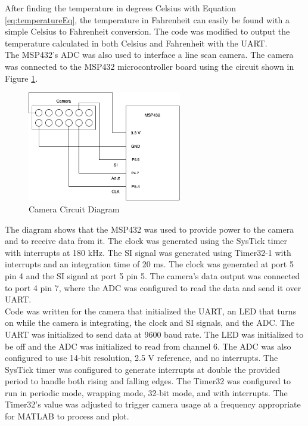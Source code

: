 \documentclass[CMPE]{KGCOEReport}
\begin{document}
After finding the temperature in degrees Celsius with Equation \ref{eq:temperatureEq}, the temperature in Fahrenheit can easily be found with a simple Celsius to Fahrenheit conversion. The code was modified to output the temperature calculated in both Celsius and Fahrenheit with the UART.\\

The MSP432's ADC was also used to interface a line scan camera. The camera was connected to the MSP432 microcontroller board using the circuit shown in Figure \ref{fig:cameraDiagram}.

\begin{figure}[H]
    \centering
    \includegraphics[width=0.6\textwidth]{cameraDiagram.png}
    \caption{Camera Circuit Diagram}
    \label{fig:cameraDiagram}
\end{figure}

The diagram shows that the MSP432 was used to provide power to the camera and to receive data from it. The clock was generated using the SysTick timer with interrupts at 180 kHz. The SI signal was generated using Timer32-1 with interrupts and an integration time of 20 ms. The clock was generated at port 5 pin 4 and the SI signal at port 5 pin 5. The camera's data output was connected to port 4 pin 7, where the ADC was configured to read the data and send it over UART.\\

Code was written for the camera that initialized the UART, an LED that turns on while the camera is integrating, the clock and SI signals, and the ADC. The UART was initialized to send data at 9600 baud rate. The LED was initialized to be off and the ADC was initialized to read from channel 6. The ADC was also configured to use 14-bit resolution, 2.5 V reference, and no interrupts. The SysTick timer was configured to generate interrupts at double the provided period to handle both rising and falling edges. The Timer32 was configured to run in periodic mode, wrapping mode, 32-bit mode, and with interrupts. The Timer32's value was adjusted to trigger camera usage at a frequency appropriate for MATLAB to process and plot.\\
\end{document}
